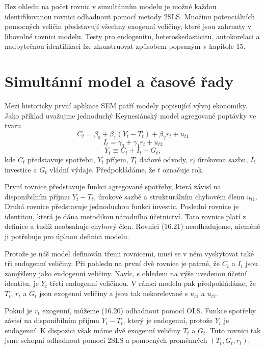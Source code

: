 Bez ohledu na počet rovnic v simultánním modelu je možné každou identifikovanou rovnici odhadnout pomocí metody 2SLS. Množinu potenciálních pomocných veličin představují všechny exogenní veličiny, které jsou zahrnuty v libovolné rovnici modelu. Testy pro endogenitu, heteroskedasticitu, autokorelaci a nadbytečnou identifikaci lze zkonstruovat způsobem popsaným v kapitole 15.

\section{Simultánní model a časové řady}

Mezi historicky první aplikace SEM patří modely popisující vývoj ekonomiky. Jako příklad uvažujme jednoduchý Keynesiánský model agregované poptávky ve tvaru
\begin{equation}
C_t = \beta_0 + \beta_1 (Y_t - T_t) + \beta_2 r_t + u_{t1}
\end{equation}
\begin{equation}
I_t = \gamma_0 + \gamma_1 r_t + u_{t2}
\end{equation}
\begin{equation}
Y_t \equiv C_t + I_t + G_t,
\end{equation}
kde $C_t$ představuje spotřebu, $Y_t$ příjem, $T_t$ daňové odvody, $r_t$ úrokovou sazbu, $I_t$ investice a $G_t$ vládní výdaje. Předpokládáme, že $t$ označuje rok.

První rovnice představuje funkci agregované spotřeby, která závisí na disponibilním příjmu $Y_t - T_t$, úrokové sazbě a strukturálním chybovém členu $u_{t1}$. Druhá rovnice představuje jednoduchou funkci investic. Poslední rovnice je identitou, která je dána metodikou národního účetnictví. Tato rovnice platí z definice a tudíž neobsahuje chybový člen. Rovnici (16.21) neodhadujeme, nicméně ji potřebuje pro úplnou definici modelu.

Protože je náš model definován třemi rovnicemi, musí se v něm vyskytovat také tři endogenní veličiny. Při pohledu na první dvě rovnice je patrné, že $C_t$ a $I_t$ jsou zamýšleny jako endogenní veličiny. Navíc, s ohledem na výše uvedenou účetní identitu, je $Y_t$ třetí endogenní veličinou. V rámci modelu pak předpokládáme, že $T_t$, $r_t$ a $G_t$ jsou exogenní veličiny a jsou tak nekorelované s $u_{t1}$ a $u_{t2}$.

Pokud je $r_t$ exogenní, můžeme (16.20) odhadnout pomocí OLS. Funkce spotřeby závisí na disponibilním příjmu $Y_t - T_t$, který je endogenní, protože $Y_t$ je endogenní. K dispozici však máme dvě exogenní veličiny $T_t$ a $G_t$. Tuto rovnici tak jsme schopni odhadnout pomocí 2SLS a pomocných proměnných $(T_t, G_t, r_t)$.

